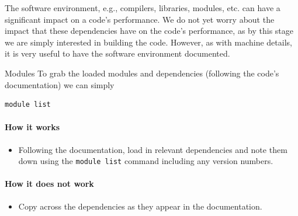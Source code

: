 The software environment, e.g., compilers, libraries, modules, etc. can have a significant impact on a code's performance. We do not yet worry about the impact that these dependencies have on the code's performance, as by this stage we are simply interested in building the code. However, as with machine details, it is very useful to have the software environment documented.

\begin{instructions}{Modules}
To grab the loaded modules and dependencies (following the code's documentation) we can simply 
\begin{verbatim}
module list
\end{verbatim}
\end{instructions}

\paragraph*{How it works}

\begin{itemize}[noitemsep]
  \item[$\boxplus$] Following the documentation, load in relevant dependencies and note them down using the \texttt{module list} command including any version numbers.
\end{itemize}


\paragraph*{How it does not work}

\begin{itemize}[noitemsep]
  \item[$\boxminus$] Copy across the dependencies as they appear in the documentation.
\end{itemize}


